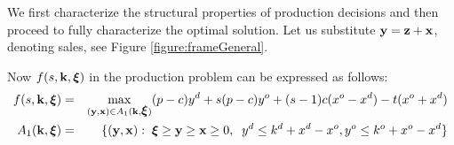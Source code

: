 \documentclass[mnsc,nonblindrev,copyedit]{informs2_wz} %
\newcommand{\proof}{\noindent{\bf Proof: } }
\newcommand{\qed}{ \hfill $\Box$ }
\newcommand{\OUT}[1]{}
\newcommand{\xiv}{\mbox{\boldmath$\xi$}}
\newcommand{\etav}{\mbox{\boldmath$\eta$}}
\newcommand{\lambdav}{\mbox{\boldmath$\lambda$}}
\newcommand{\alphav}{\mbox{\boldmath$\alpha$}}
\begin{document}
\OUT{
\proof For simplicity of the presentation, let $\alpha_{jl}$ be the coefficient of decision variable of objective function in (\ref{eqn:profit}), {\it i.e.}, $\alpha_{dd} = p-c, \; \alpha_{od} = p-cs-t,\; \alpha_{do} = sp -c -t, \; \alpha_{oo} = s(p-c)$.  To prove submodularity, we first write the dual of the production problem:
\begin{eqnarray*eqnarray*}
\begin{array}{lll}
    f(s,\bold k, \xiv) &=& \min_{(\etav, \lambdav) \in B (\alphav)} G (\etav, \lambdav, \bold k ,\xiv)  \\
    G(\etav,\lambdav,\bold k, \xiv) &=& \etav \bold k + \lambdav \xiv \\
    B (\alphav) &=& \{\eta_j+\lambda_l  \leq \alpha_{jl} \; \forall j \in \{d,o\}, \; \forall l \in \{d,o\},\;  \etav \geq 0,\; \lambdav \geq 0 \}
\end{array}
\end{eqnarray*eqnarray*}
To see the relationship between $\bold k$ and $-\xiv$, we substitute $\bar{\xiv} = - \xiv$ and $\bar{\etav} = - \etav$.  Then, the dual problem becomes:
\begin{eqnarray*eqnarray*}
\begin{array}{lll}
    f(s,\bold k, \xiv) &=& \min_{(\bar{\etav}, \lambdav) \in B_1 (\alphav)} G (\bar{\etav}, \lambdav, \bold k ,\bar{\xiv})  \\
    G(\bar{\etav},\lambdav,\bold k, \bar{\xiv}) &=& -\bar{\etav} \bold k - \lambdav \bar{\xiv} \\
     B_1(\alphav) &=& \{-\bar{\eta}_j+\lambda_l  \leq \alpha_{jl} \; \forall j \in \{d,o\}, \; \forall l \in \{d,o\},\;  \bar{\etav} \leq 0,\; \lambdav \geq 0 \}
\end{array}
\end{eqnarray*eqnarray*}
The objective function $G$ is submodular in $(\bar{\etav},\bold k,\lambdav, \bar{\xiv})$ and the constraint set $B_1$  is a sublattice of $(\bar{\etav},\lambdav)$.  Since minimizing submodular function over a sublattice preserves submodularity, $f$ is submodular in $(\bold{k}, -\xiv)$.  \qed
}

We first characterize the structural properties of production decisions and then proceed to fully characterize the optimal solution.  Let us substitute $\bold y = \bold z+ \bold x$, denoting sales, see Figure \ref{figure:frameGeneral}.

Now $f(s,\bold{k},\xiv)$ in{ the production problem} can be
expressed as follows:
\begin{eqnarray}
    f(s,\bold {k},\xiv) &=& \max_{(\bold{y,x}) \in A_1(\bold{k},\xiv)} (p-c)y^d + s(p-c)y^o + (s-1)c(x^o -x^d) %
    -t(x^o + x^d) \label{eqn:fSales}\\
    A_1(\bold{k},\xiv) &=& \{(\bold{y,x}):\; \xiv \geq \bold y \geq \bold x \geq 0, \; \; y^d \leq k^d+x^d -x^o, y^o \leq k^o+x^o-x^d\} \label{eqn:A1}
\end{eqnarray}
\end{document}

